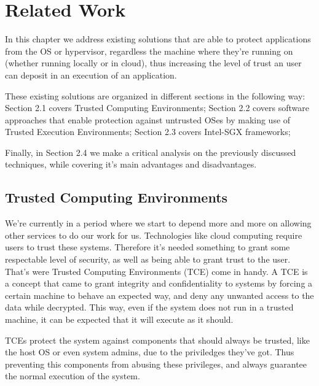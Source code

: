 \chapter{Related Work}
\label{cha:users_manual}

In this chapter we address existing solutions that are able to protect applications from the OS or hypervisor, regardless the machine where they're running on (whether running locally or in cloud), thus increasing the level of trust an user can deposit in an execution of an application.

These existing solutions are organized in different sections in the following way: Section 2.1 covers Trusted Computing Environments; Section 2.2 covers software approaches that enable protection against untrusted OSes by making use of Trusted Execution Environments; Section 2.3 covers Intel-SGX frameworks; 

Finally, in Section 2.4 we make a critical analysis on the previously discussed techniques, while covering it's main advantages and disadvantages.


\section{Trusted Computing Environments} %
\label{sec:introduction}
We're currently in a period where we start to depend more and more on allowing other services to do our work for us. Technologies like cloud computing require users to trust these systems. Therefore it's needed something to grant some respectable level of security, as well as being able to grant trust to the user. That's were Trusted Computing Environments (TCE) come in handy.
A TCE is a concept that came to grant integrity and confidentiality to systems by forcing a certain machine to behave an expected way, and deny any unwanted access to the data while decrypted. This way, even if the system does not run in a trusted machine, it can be expected that it will execute as it should. 

TCEs protect the system against components that should always be trusted, like the host OS or even system admins, due to the priviledges they've got. Thus preventing this components from abusing these privileges, and always guarantee the normal execution of the system. 

